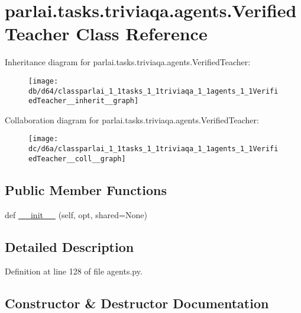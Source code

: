 \hypertarget{classparlai_1_1tasks_1_1triviaqa_1_1agents_1_1VerifiedTeacher}{}\section{parlai.\+tasks.\+triviaqa.\+agents.\+Verified\+Teacher Class Reference}
\label{classparlai_1_1tasks_1_1triviaqa_1_1agents_1_1VerifiedTeacher}


Inheritance diagram for parlai.\+tasks.\+triviaqa.\+agents.\+Verified\+Teacher\+:\nopagebreak
\begin{figure}[H]
\begin{center}
\leavevmode
\texttt{[image: db/d64/classparlai\_1\_1tasks\_1\_1triviaqa\_1\_1agents\_1\_1VerifiedTeacher\_\_inherit\_\_graph]}
\end{center}
\end{figure}


Collaboration diagram for parlai.\+tasks.\+triviaqa.\+agents.\+Verified\+Teacher\+:\nopagebreak
\begin{figure}[H]
\begin{center}
\leavevmode
\texttt{[image: dc/d6a/classparlai\_1\_1tasks\_1\_1triviaqa\_1\_1agents\_1\_1VerifiedTeacher\_\_coll\_\_graph]}
\end{center}
\end{figure}
\subsection*{Public Member Functions}
\begin{DoxyCompactItemize}
\item 
def \hyperlink{classparlai_1_1tasks_1_1triviaqa_1_1agents_1_1VerifiedTeacher_abef3ebd81d68d58d356a27bca5ec036c}{\+\_\+\+\_\+init\+\_\+\+\_\+} (self, opt, shared=None)
\end{DoxyCompactItemize}


\subsection{Detailed Description}


Definition at line 128 of file agents.\+py.



\subsection{Constructor \& Destructor Documentation}
\mbox{\label{classparlai_1_1tasks_1_1triviaqa_1_1agents_1_1VerifiedTeacher_abef3ebd81d68d58d356a27bca5ec036c}} 
